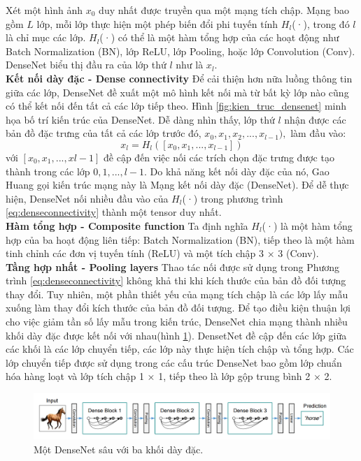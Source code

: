 Xét một hình ảnh $x_0$ duy nhất được truyền qua một mạng tích chập. Mạng bao gồm $L$ lớp, mỗi lớp thực hiện một phép biến đổi phi tuyến tính $H_l$(·), trong đó $l$ là chỉ mục các lớp. $H_l$(·) có thể là một hàm tổng hợp của các hoạt động như Batch Normalization (BN), lớp ReLU, lớp Pooling, hoặc lớp Convolution (Conv). DenseNet biểu thị đầu ra của lớp thứ $l$ như là $x_l$.\\
{\bf Kết nối dày đặc - Dense connectivity}
Để cải thiện hơn nữa luồng thông tin giữa các lớp, DenseNet đề xuất một mô hình kết nối mà từ bất kỳ lớp nào cũng có thể kết nối đến tất cả các lớp tiếp theo. Hình \ref{fig:kien_truc_densenet} minh họa bố trí kiến trúc của DenseNet. Dễ dàng nhìn thấy, lớp thứ $l$ nhận được các bản đồ đặc trưng của tất cả các lớp trước đó, $x_0, x_1, x_2, . . . , x_{l-1}),$ làm đầu vào:
\begin{equation}\label{eq:denseconnectivity}
	x_l = H_l([x_0, x_1, . . . , x_{l-1}])
\end{equation}
với $[x_0, x_1, . . . , x{l-1}]$ đề cập đến việc nối các trích chọn đặc trưng được tạo thành trong các lớp $0, 1, ..., {l-1}$. Do khả năng kết nối dày đặc của nó, Gao Huang\cite{densenet} gọi kiến trúc mạng này là Mạng kết nối dày đặc (DenseNet). Để dễ thực hiện, DenseNet nối nhiều đầu vào của $H_l$(·) trong phương trình \ref{eq:denseconnectivity} thành một tensor duy nhất.\\
{\bf Hàm tổng hợp - Composite function}
Ta định nghĩa $H_l$(·) là một hàm tổng hợp của ba hoạt động liên tiếp: Batch Normalization (BN), tiếp theo là một hàm tinh chỉnh các đơn vị tuyến tính (ReLU) và một tích chập 3 × 3 (Conv).\\
{\bf Tầng hợp nhất - Pooling layers}
Thao tác nối được sử dụng trong Phương trình \ref{eq:denseconnectivity} không khả thi khi kích thước của bản đồ đối tượng thay đổi. Tuy nhiên, một phần thiết yếu của mạng tích chập là các lớp lấy mẫu xuống làm thay đổi kích thước của bản đồ đối tượng. Để tạo điều kiện thuận lợi cho việc giảm tần số lấy mẫu trong kiến trúc, DenseNet chia mạng thành nhiều khối dày đặc được kết nối với nhau(hình \ref{fig:densenet_3blk}). DensetNet đề cập đến các lớp giữa các khối là các lớp chuyển tiếp, các lớp này thực hiện tích chập và tổng hợp. Các lớp chuyển tiếp được sử dụng trong các cấu trúc DenseNet bao gồm lớp chuẩn hóa hàng loạt và lớp tích chập 1 × 1, tiếp theo là lớp gộp trung bình 2 × 2.
\begin{figure}[H]
	\centering
	\includegraphics[width=1\linewidth]{images/densenet_3blk}
	\caption{Một DenseNet sâu với ba khối dày đặc.}
	\label{fig:densenet_3blk}
\end{figure}
